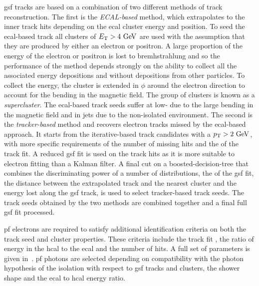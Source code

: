 \acrshort{gsf} tracks are based on a combination of two different methods of track reconstruction.
The first is the \textit{ECAL-based} method, which extrapolates to the inner track hits depending on the \acrshort{ecal} cluster energy and position.
To seed the \acrshort{ecal}-based track all clusters of $E_{\mathrm{T}}>4\mathrm{~Ge\hspace{-.08em}V}^{}$ are used with the assumption that they are produced by either an electron or positron.
A large proportion of the energy of the electron or positron is lost to bremhstrahlung and so the performance of the method depends strongly on the ability to collect all the associated energy depositions and without depositions from other particles.
To collect the energy, the cluster is extended in $\phi$ around the electron direction to account for the bending in the magnetic field.
The group of clusters is known as a \textit{supercluster}.
The \acrshort{ecal}-based track seeds suffer at low-\pt{} due to the large bending in the magnetic field and in jets due to the non-isolated environment.
The second is the \textit{tracker-based} method and recovers electron tracks missed by the \acrshort{ecal}-based approach.
It starts from the iterative-based track candidates with a $p_{\mathrm{T}}>2\mathrm{~Ge\hspace{-.08em}V}^{}$, with more specific requirements of the number of missing hits and the \chisq{} of the track fit.
A reduced \acrshort{gsf} fit is used on the track hits as it is more suitable to electron fitting than a Kalman filter.
A final cut on a boosted-decision-tree that combines the discriminating power of a number of distributions, \eg{} the \chisq{} of the \acrshort{gsf} fit, the distance between the extrapolated track and the nearest cluster and the energy lost along the \acrshort{gsf} track, is used to select tracker-based track seeds.
The track seeds obtained by the two methods are combined together and a final full \acrshort{gsf} fit processed.

\acrshort{pf} electrons are required to satisfy additional identification criteria on both the track seed and cluster properties.
These criteria include the track fit \chisq{}, the ratio of energy in the \acrshort{hcal} to the \acrshort{ecal} and the number of hits.
A full set of parameters is given in~\cite{Event:PFlow}.
\acrshort{pf} photons are selected depending on compatibility with the photon hypothesis of the isolation with respect to \acrshort{gsf} tracks and clusters, the shower shape and the \acrshort{ecal} to \acrshort{hcal} energy ratio.


